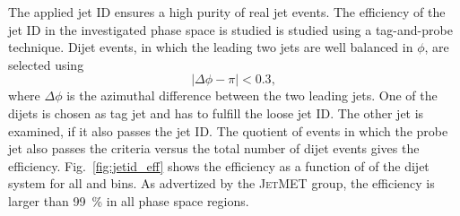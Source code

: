 The applied jet ID ensures a high purity of real jet events. The efficiency of
the jet ID in the investigated phase space is studied is studied using a
tag-and-probe technique. Dijet events, in which the leading two jets are well
balanced in $\phi$, are selected using
%
\begin{equation*}
    | \Delta\phi - \pi | < 0.3,
\end{equation*}
%
where $\Delta\phi$ is the azimuthal difference between the two leading jets. One
of the dijets is chosen as tag jet and has to fulfill the loose jet ID. The
other jet is examined, if it also passes the jet ID. The quotient of events in
which the probe jet also passes the criteria versus the total number of dijet
events gives the efficiency. Fig.~\ref{fig:jetid_eff} shows the
efficiency as a function of \ptavg of the dijet system for all \ystar and
\yboost bins. As advertized by the \textsc{JetMET} group, the efficiency is
larger than \SI{99}{\percent} in all phase space regions.

